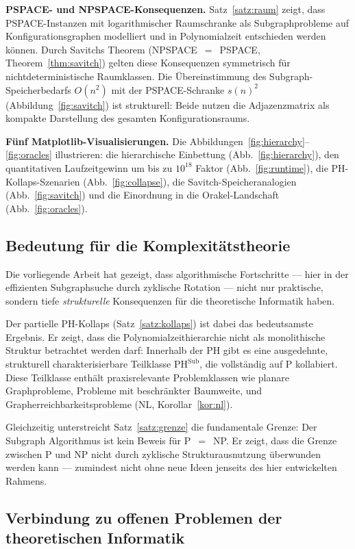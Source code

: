 ﻿\documentclass[a4paper,12pt]{article}
\theoremstyle{definition}
\begin{document}
\textbf{PSPACE- und NPSPACE-Konsequenzen.}
Satz~\ref{satz:raum} zeigt, dass PSPACE-Instanzen mit logarithmischer Raumschranke
als Subgraphprobleme auf Konfigurationsgraphen modelliert und in Polynomialzeit
entschieden werden können. Durch Savitchs Theorem (NPSPACE~$=$~PSPACE,
Theorem~\ref{thm:savitch}) gelten diese Konsequenzen symmetrisch für
nichtdeterministische Raumklassen. Die Übereinstimmung des Subgraph-Speicherbedarfs
$O(n^2)$ mit der PSPACE-Schranke $s(n)^2$ (Abbildung~\ref{fig:savitch}) ist
strukturell: Beide nutzen die Adjazenzmatrix als kompakte Darstellung des
gesamten Konfigurationsraums.

\textbf{Fünf Matplotlib-Visualisierungen.}
Die Abbildungen~\ref{fig:hierarchy}--\ref{fig:oracles} illustrieren:
die hierarchische Einbettung (Abb.~\ref{fig:hierarchy}),
den quantitativen Laufzeitgewinn um bis zu $10^{18}$ Faktor (Abb.~\ref{fig:runtime}),
die PH-Kollaps-Szenarien (Abb.~\ref{fig:collapse}),
die Savitch-Speicheranalogien (Abb.~\ref{fig:savitch}) und
die Einordnung in die Orakel-Landschaft (Abb.~\ref{fig:oracles}).

\subsection{Bedeutung für die Komplexitätstheorie}

Die vorliegende Arbeit hat gezeigt, dass algorithmische Fortschritte ---
hier in der effizienten Subgraphsuche durch zyklische Rotation ---
nicht nur praktische, sondern tiefe \emph{strukturelle} Konsequenzen für
die theoretische Informatik haben.

Der partielle PH-Kollaps (Satz~\ref{satz:kollaps}) ist dabei das bedeutsamste
Ergebnis. Er zeigt, dass die Polynomialzeithierarchie nicht als monolithische
Struktur betrachtet werden darf: Innerhalb der PH gibt es eine ausgedehnte,
strukturell charakterisierbare Teilklasse $\mathrm{PH}^{\mathrm{Sub}}$,
die vollständig auf P kollabiert. Diese Teilklasse enthält praxisrelevante
Problemklassen wie planare Graphprobleme, Probleme mit beschränkter Baumweite,
und Grapherreichbarkeitsprobleme (NL, Korollar~\ref{kor:nl}).

Gleichzeitig unterstreicht Satz~\ref{satz:grenze} die fundamentale Grenze:
Der Subgraph Algorithmus ist kein Beweis für P~$=$~NP. Er zeigt, dass die
Grenze zwischen P und NP nicht durch zyklische Strukturausnutzung überwunden
werden kann --- zumindest nicht ohne neue Ideen jenseits des hier entwickelten Rahmens.

\subsection{Verbindung zu offenen Problemen der theoretischen Informatik}
\end{document}

